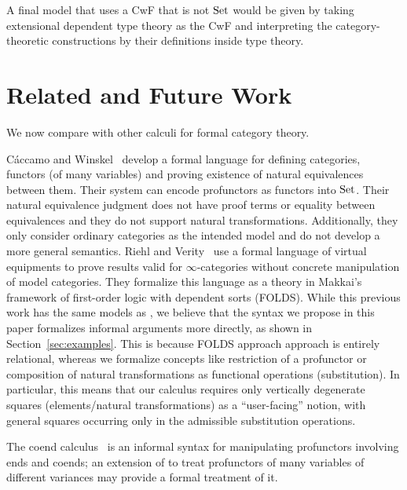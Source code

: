 \documentclass{llncs}
\begin{document}
A final model that uses a CwF that is not $\textrm{Set}$ would be given by
taking extensional dependent type theory as the CwF and interpreting
the category-theoretic constructions by their definitions inside type
theory.

\section{Related and Future Work}
\label{sec:discussion}

We now compare \vett{} with other calculi for formal category theory.  

C\'accamo and Winskel~\cite{caccamo_winskel_2001} develop a formal
language for defining categories, functors (of many variables) and
proving existence of natural equivalences between them. Their system
can encode profunctors as functors into $\textrm{Set}$. Their natural
equivalence judgment does not have proof terms or equality between
equivalences and they do not support natural
transformations. Additionally, they only consider ordinary categories
as the intended model and do not develop a more general semantics.
Riehl and Verity~\cite{riehl_verity_2022} use a formal language of virtual
equipments to prove results valid for $\infty$-categories without
concrete manipulation of model categories. They formalize this language
as a theory in Makkai's framework of first-order logic with dependent
sorts (FOLDS).  While this previous work has the same models as \vett{},
we believe that the syntax we propose in this paper formalizes informal
arguments more directly, as shown in Section~\ref{sec:examples}.  This
is because FOLDS approach approach is entirely relational, whereas we
formalize concepts like restriction of a profunctor or composition of
natural transformations as functional operations (substitution).  In
particular, this means that our calculus requires only vertically
degenerate squares (elements/natural transformations) as a
``user-facing'' notion, with general squares occurring only in the
admissible substitution operations.


The coend calculus~\citet{loregian_2021} is an informal syntax for
manipulating profunctors involving ends and coends; an extension of
\vett{} to treat profunctors of many variables of different variances
may provide a formal treatment of it.
\end{document}
